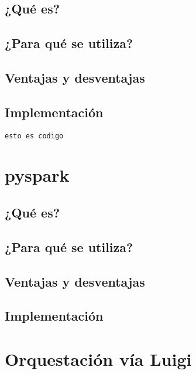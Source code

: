 \documentclass[]{article}
\begin{document}
\subsection{¿Qué es?}\label{que-es}

\subsection{¿Para qué se utiliza?}\label{para-que-se-utiliza}

\subsection{Ventajas y desventajas}\label{ventajas-y-desventajas}

\subsection{Implementación}\label{implementacion}

\begin{verbatim}
esto es codigo
\end{verbatim}

\section{pyspark}\label{pyspark}

\subsection{¿Qué es?}\label{que-es-1}

\subsection{¿Para qué se utiliza?}\label{para-que-se-utiliza-1}

\subsection{Ventajas y desventajas}\label{ventajas-y-desventajas-1}

\subsection{Implementación}\label{implementacion-1}

\section{Orquestación vía Luigi}\label{orquestacion-via-luigi}
\end{document}

